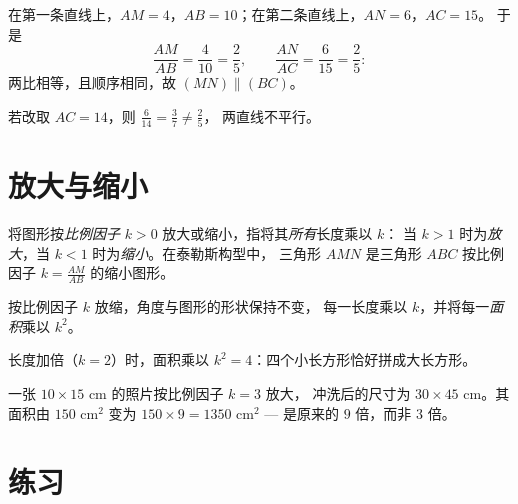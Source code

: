 \begin{example}\label{ex:g9:thales:converse}
在第一条直线上，$AM = 4$，$AB = 10$；在第二条直线上，$AN = 6$，$AC = 15$。
于是
\[
\frac{AM}{AB} = \frac{4}{10} = \frac25,
\qquad
\frac{AN}{AC} = \frac{6}{15} = \frac25 :
\]
两比相等，且顺序相同，故 $(MN) \parallel (BC)$。

若改取 $AC = 14$，则 $\frac{6}{14} = \frac37 \neq \frac25$，
两直线不平行。
\end{example}

\section{放大与缩小}

\begin{definition}[图形的放缩]\label{def:g9:thales:scaling}
将图形按\emph{比例因子}
$k > 0$ 放大或缩小，指将其\emph{所有}长度乘以 $k$：
当 $k > 1$ 时为\emph{放大}，当
$k < 1$ 时为\emph{缩小}。在泰勒斯构型中，
三角形 $AMN$ 是三角形 $ABC$ 按比例因子 $k = \frac{AM}{AB}$ 的缩小图形。
\end{definition}

\begin{proposition}[对角度与面积的影响]\label{prop:g9:thales:scaling}
按比例因子 $k$ 放缩，角度与图形的形状保持不变，
每一长度乘以 $k$，并将每一\emph{面积}乘以
$k^2$。
\end{proposition}
\admitted

\begin{omfigure}

{\small 长度加倍（$k = 2$）时，面积乘以
$k^2 = 4$：四个小长方形恰好拼成大长方形。}
\end{omfigure}

\begin{example}
一张 $10 \times 15$ cm 的照片按比例因子 $k = 3$ 放大，
冲洗后的尺寸为 $30 \times 45$ cm。其面积由 $150$ cm$^2$ 变为
$150 \times 9 = 1350$ cm$^2$ --- 是原来的 $9$ 倍，而非 $3$ 倍。
\end{example}

\section{练习}

